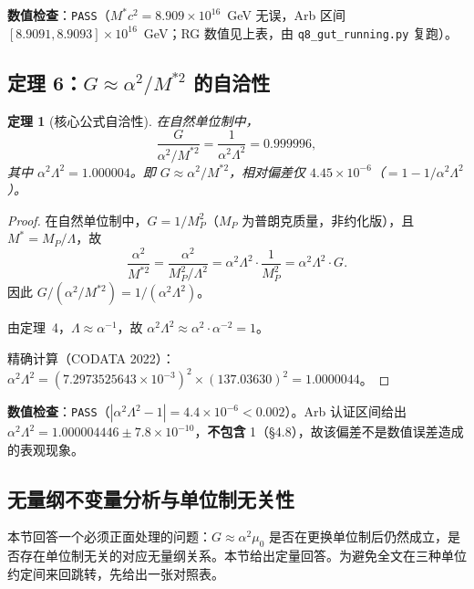 \documentclass[12pt,a4paper]{article}
\newtheorem{theorem}{定理}
\begin{document}
\noindent\textbf{数值检查}：\texttt{PASS}（$M^*c^2=8.909\times10^{16}$~GeV 无误，Arb 区间 $[8.9091,8.9093]\times10^{16}$~GeV；RG 数值见上表，由 \texttt{q8\_\allowbreak{}gut\_\allowbreak{}running.py} 复跑）。

\subsection{定理 6：$G \approx \alpha^2/M^{*2}$ 的自洽性}

\begin{theorem}[核心公式自洽性]
在自然单位制中，
\begin{equation}
  \frac{G}{\alpha^2/M^{*2}} = \frac{1}{\alpha^2\Lambda^2} = 0.999996,
\end{equation}
其中 $\alpha^2\Lambda^2 = 1.000004$。即 $G \approx \alpha^2/M^{*2}$，相对偏差仅 $4.45\times10^{-6}$（$=1-1/\alpha^2\Lambda^2$）。
\end{theorem}

\begin{proof}
在自然单位制中，$G = 1/M_P^2$（$M_P$ 为普朗克质量，非约化版），且 $M^* = M_P/\Lambda$，故
\[
  \frac{\alpha^2}{M^{*2}} = \frac{\alpha^2}{M_P^2/\Lambda^2} = \alpha^2\Lambda^2 \cdot \frac{1}{M_P^2} = \alpha^2\Lambda^2 \cdot G.
\]
因此 $G / (\alpha^2/M^{*2}) = 1/(\alpha^2\Lambda^2)$。

由定理~4，$\Lambda \approx \alpha^{-1}$，故 $\alpha^2\Lambda^2 \approx \alpha^2 \cdot \alpha^{-2} = 1$。

精确计算（CODATA 2022）：$\alpha^2\Lambda^2 = (7.2973525643\times10^{-3})^2 \times (137.03630)^2 = 1.0000044$。
\end{proof}

\noindent\textbf{数值检查}：\texttt{PASS}（$|\alpha^2\Lambda^2 - 1| = 4.4\times10^{-6} < 0.002$）。Arb 认证区间给出 $\alpha^2\Lambda^2 = 1.000004446 \pm 7.8\times10^{-10}$，\textbf{不包含} 1（§4.8），故该偏差不是数值误差造成的表观现象。

\subsection{无量纲不变量分析与单位制无关性}

本节回答一个必须正面处理的问题：$G \approx \alpha^2\mu_0$ 是否在更换单位制后仍然成立，是否存在单位制无关的对应无量纲关系。本节给出定量回答。为避免全文在三种单位约定间来回跳转，先给出一张对照表。
\end{document}

